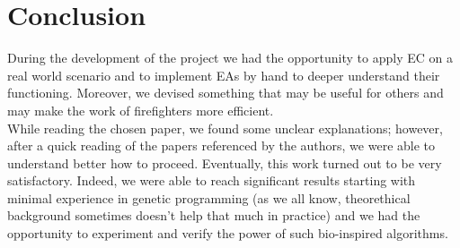 \section{Conclusion}
During the development of the project we had the opportunity to apply EC on a real world scenario 
and to implement EAs by hand to deeper understand their functioning. Moreover, we devised something that may be useful for others and may make the work
of firefighters more efficient.\\
While reading the chosen paper, we found some unclear explanations; however, after a quick reading of the papers referenced by the authors, we were able to understand better how to proceed.
Eventually, this work turned out to be very satisfactory. Indeed, we were able to reach significant results starting with minimal experience in genetic programming (as we all know, theorethical background sometimes doesn't help that much in practice) and we had the opportunity to experiment and verify the power of such bio-inspired algorithms.
